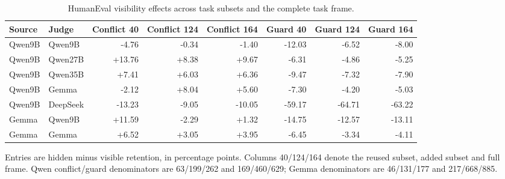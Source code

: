 \begin{table}[t]
\centering
\small
\caption{HumanEval visibility effects across task subsets and the complete task frame.}
\label{tab:s_task_splits}
\begin{tabular}{llrrrrrr}
\toprule
Source & Judge & Conflict 40 & Conflict 124 & Conflict 164 & Guard 40 & Guard 124 & Guard 164 \\
\midrule
Qwen9B & Qwen9B & -4.76 & -0.34 & -1.40 & -12.03 & -6.52 & -8.00 \\
Qwen9B & Qwen27B & +13.76 & +8.38 & +9.67 & -6.31 & -4.86 & -5.25 \\
Qwen9B & Qwen35B & +7.41 & +6.03 & +6.36 & -9.47 & -7.32 & -7.90 \\
Qwen9B & Gemma & -2.12 & +8.04 & +5.60 & -7.30 & -4.20 & -5.03 \\
Qwen9B & DeepSeek & -13.23 & -9.05 & -10.05 & -59.17 & -64.71 & -63.22 \\
Gemma & Qwen9B & +11.59 & -2.29 & +1.32 & -14.75 & -12.57 & -13.11 \\
Gemma & Gemma & +6.52 & +3.05 & +3.95 & -6.45 & -3.34 & -4.11 \\
\bottomrule
\end{tabular}
\par\smallskip
\begin{minipage}{\linewidth}
\footnotesize
Entries are hidden minus visible retention, in percentage points. Columns 40/124/164 denote the reused subset, added subset and full frame. Qwen conflict/guard denominators are 63/199/262 and 169/460/629; Gemma denominators are 46/131/177 and 217/668/885.
\end{minipage}
\end{table}
